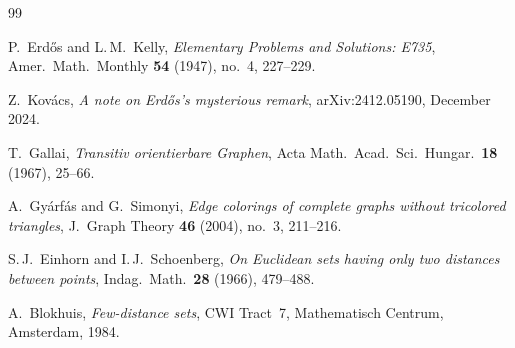 \documentclass[12pt]{amsart}
\theoremstyle{definition}
\begin{document}
\begin{thebibliography}{99}

P.~Erd\H{o}s and L.\,M.~Kelly,
\emph{Elementary Problems and Solutions: E735},
Amer.\ Math.\ Monthly \textbf{54} (1947), no.~4, 227--229.

Z.~Kov\'acs,
\emph{A note on Erd\H{o}s's mysterious remark},
arXiv:2412.05190, December 2024.

T.~Gallai,
\emph{Transitiv orientierbare Graphen},
Acta Math.\ Acad.\ Sci.\ Hungar.\ \textbf{18} (1967), 25--66.

A.~Gy\'arf\'as and G.~Simonyi,
\emph{Edge colorings of complete graphs without tricolored triangles},
J.~Graph Theory \textbf{46} (2004), no.~3, 211--216.

S.\,J.~Einhorn and I.\,J.~Schoenberg,
\emph{On Euclidean sets having only two distances between points},
Indag.\ Math.\ \textbf{28} (1966), 479--488.

A.~Blokhuis,
\emph{Few-distance sets},
CWI Tract~7, Mathematisch Centrum, Amsterdam, 1984.

\end{thebibliography}
\end{document}
